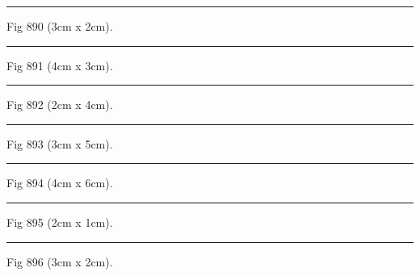 \documentclass[a4paper,11pt]{article}
\begin{document}
\begin{swarmwrap}%
  \begin{minipage}[t]{3cm}
    \centering
    \rule{\linewidth}{2cm}
    {\footnotesize Fig 890 (3cm x 2cm).}
  \end{minipage}%
\end{swarmwrap}%
\swarmwrapnext
\lipsum[140]%

\begin{swarmwrap}%
  \begin{minipage}[t]{4cm}
    \centering
    \rule{\linewidth}{3cm}
    {\footnotesize Fig 891 (4cm x 3cm).}
  \end{minipage}%
\end{swarmwrap}%
\swarmwrapnext
\lipsum[141]%

\begin{swarmwrap}%
  \begin{minipage}[t]{2cm}
    \centering
    \rule{\linewidth}{4cm}
    {\footnotesize Fig 892 (2cm x 4cm).}
  \end{minipage}%
\end{swarmwrap}%
\swarmwrapnext
\lipsum[142]%

\begin{swarmwrap}%
  \begin{minipage}[t]{3cm}
    \centering
    \rule{\linewidth}{5cm}
    {\footnotesize Fig 893 (3cm x 5cm).}
  \end{minipage}%
\end{swarmwrap}%
\swarmwrapnext
\lipsum[143]%

\begin{swarmwrap}%
  \begin{minipage}[t]{4cm}
    \centering
    \rule{\linewidth}{6cm}
    {\footnotesize Fig 894 (4cm x 6cm).}
  \end{minipage}%
\end{swarmwrap}%
\swarmwrapnext
\lipsum[144]%

\begin{swarmwrap}%
  \begin{minipage}[t]{2cm}
    \centering
    \rule{\linewidth}{1cm}
    {\footnotesize Fig 895 (2cm x 1cm).}
  \end{minipage}%
\end{swarmwrap}%
\swarmwrapnext
\lipsum[145]%

\begin{swarmwrap}%
  \begin{minipage}[t]{3cm}
    \centering
    \rule{\linewidth}{2cm}
    {\footnotesize Fig 896 (3cm x 2cm).}
  \end{minipage}%
\end{swarmwrap}%
\swarmwrapnext
\lipsum[146]%
\end{document}
